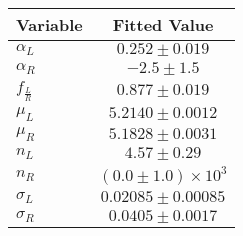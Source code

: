 \begin{tabular}[t]{lc}
\hline
Variable &Fitted Value\\
\hline\hline
$\alpha_L$&$0.252\pm0.019$\\
\hline
$\alpha_R$&$-2.5\pm1.5$\\
\hline
$f_{\frac{L}{R}}$&$0.877\pm0.019$\\
\hline
$\mu_L$&$5.2140\pm0.0012$\\
\hline
$\mu_R$&$5.1828\pm0.0031$\\
\hline
$n_L$&$4.57\pm0.29$\\
\hline
$n_R$&$(0.0\pm1.0)\times 10^3$\\
\hline
$\sigma_L$&$0.02085\pm0.00085$\\
\hline
$\sigma_R$&$0.0405\pm0.0017$\\
\hline
\end{tabular}